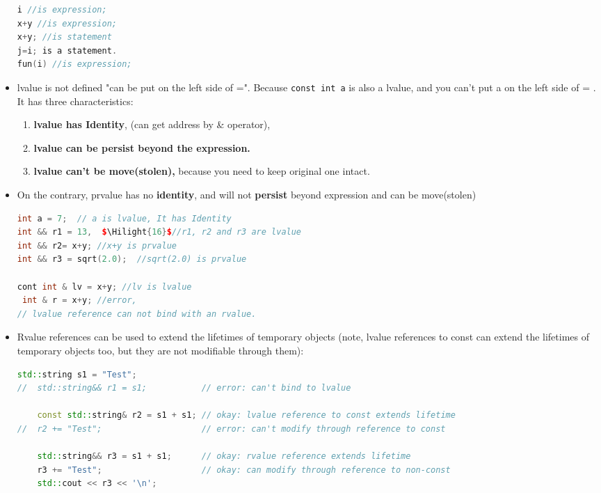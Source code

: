 \documentclass[a4paper,12pt,twoside]{book}
\newcommand{\Hilight}[1]{\makebox[0pt][l]{\color{yellow}\rule[-3pt]{#1em}{11pt}}}
\begin{document}
\begin{itemize}
\begin{lstlisting}[frame=single, language=c++]
i //is expression;
x+y //is expression;
x+y; //is statement
j=i; is a statement.
fun(i) //is expression;
\end{lstlisting}

\item lvalue is not defined "can be put on the left side of =". Because \texttt{const int a} is also a lvalue, and you can't put a on the left side of = . It has three characteristics:
\begin{enumerate}
\item\textbf{ lvalue has Identity}, (can get address by \& operator),
\item \textbf{lvalue can be persist beyond the expression. }
\item \textbf{lvalue can't be move(stolen),} because you need to keep original one intact.
\end{enumerate}

\item On the contrary, prvalue has no \textbf{identity}, and will not \textbf{persist} beyond expression and can be move(stolen)

\begin{lstlisting}[frame=single, language=c++, mathescape=true]
int a = 7;  // a is lvalue, It has Identity
int && r1 = 13,  $\Hilight{16}$//r1, r2 and r3 are lvalue
int && r2= x+y; //x+y is prvalue
int && r3 = sqrt(2.0);  //sqrt(2.0) is prvalue

cont int & lv = x+y; //lv is lvalue
 int & r = x+y; //error,
// lvalue reference can not bind with an rvalue.
\end{lstlisting}

\item Rvalue references can be used to extend the lifetimes of temporary objects (note, lvalue references to const can extend the lifetimes of temporary objects too, but they are not modifiable through them):

\begin{lstlisting}[frame=single, language=c++, mathescape=true]
    std::string s1 = "Test";
//  std::string&& r1 = s1;           // error: can't bind to lvalue
 
    const std::string& r2 = s1 + s1; // okay: lvalue reference to const extends lifetime
//  r2 += "Test";                    // error: can't modify through reference to const
 
    std::string&& r3 = s1 + s1;      // okay: rvalue reference extends lifetime
    r3 += "Test";                    // okay: can modify through reference to non-const
    std::cout << r3 << '\n';
\end{lstlisting}


\end{itemize}
\end{document}
